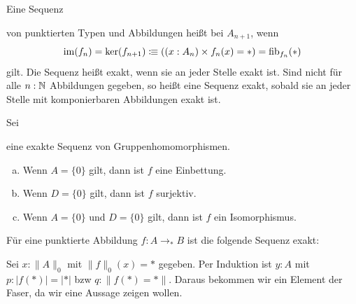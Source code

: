 \begin{definition}
  Eine Sequenz
  \begin{center}
  \end{center}
  von punktierten Typen und Abbildungen heißt  bei \(A_{n+1}\),
  wenn \[\mathrm{im}(f_{n})=\ker({f_{n+1}})\vcentcolon\mspace{-1.2mu}\equiv ((x:A_n)\times f_{n}(x)=\ast)=\mathrm{fib}_{f_n}(\ast)\]
  gilt. Die Sequenz heißt exakt, wenn sie an jeder Stelle exakt ist.
  Sind nicht für alle \(n:\mathbb{N}\) Abbildungen gegeben, so heißt eine Sequenz exakt, sobald sie an jeder Stelle mit komponierbaren Abbildungen exakt ist.
\end{definition}

\begin{lemma}
  Sei
  \begin{center}
  \end{center}
  eine exakte Sequenz von Gruppenhomomorphismen.
  \begin{enumerate}[(a)]
  \item Wenn \(A=\{0\}\) gilt, dann ist \(f\) eine Einbettung.
  \item Wenn \(D=\{0\}\) gilt, dann ist \(f\) surjektiv.
  \item Wenn \(A=\{0\}\) und \(D=\{0\}\) gilt, dann ist \(f\) ein Isomorphismus.
  \end{enumerate}
\end{lemma}

\begin{lemma}
  \label{0-abschneidung-faser-exakt}
  Für eine punktierte Abbildung \(f:A\to_\ast B\) ist die folgende Sequenz exakt:
  \begin{center}
  \end{center}
\end{lemma}


\begin{beweis}
  Sei \(x:\|A\|_0\) mit \(\|f\|_0(x)=\ast\) gegeben.
  Per Induktion ist \(y:A\) mit \(p:|f(\ast)|=|\ast|\) bzw \(q:\|f(\ast)=\ast\|\).
  Daraus bekommen wir ein Element der Faser, da wir eine Aussage zeigen wollen.
\end{beweis}

